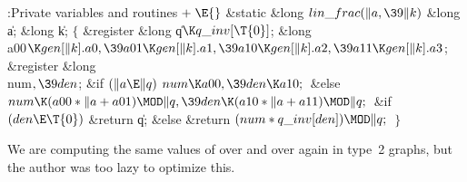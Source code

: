 \Y\B\4:Private variables and routines\X${}\mathrel+\E{}$\6
\1\1\&{static} \&{long} ${}\\{lin\_frac}(\|a,\39\|k){}$\6
\&{long} \|a;\6
\&{long} \|k;\2\2\6
${}\{{}$\5
\1\&{register} \&{long} \|q${}\K\\{q\_inv}[\T{0}]{}$;\6
\&{long} \\{a00}${}\K\\{gen}[\|k].\\{a0},\39\\{a01}\K\\{gen}[\|k].\\{a1},\39%
\\{a10}\K\\{gen}[\|k].\\{a2},\39\\{a11}\K\\{gen}[\|k].\\{a3}{}$;\6
\&{register} \&{long} \\{num}${},\39\\{den}{}$;\7
\&{if} ${}(\|a\E\|q){}$\1\5
${}\\{num}\K\\{a00},\39\\{den}\K\\{a10};{}$\2\6
\&{else}\1\5
${}\\{num}\K(\\{a00}*\|a+\\{a01})\MOD\|q,\39\\{den}\K(\\{a10}*\|a+\\{a11})\MOD%
\|q;{}$\2\6
\&{if} ${}(\\{den}\E\T{0}){}$\1\5
\&{return} \|q;\2\6
\&{else}\1\5
\&{return} ${}(\\{num}*\\{q\_inv}[\\{den}])\MOD\|q;{}$\2\6
\4${}\}{}$\2\par
\fi

We are computing the same values of  over and over
again in type~2
graphs, but the author was too lazy to optimize this.

